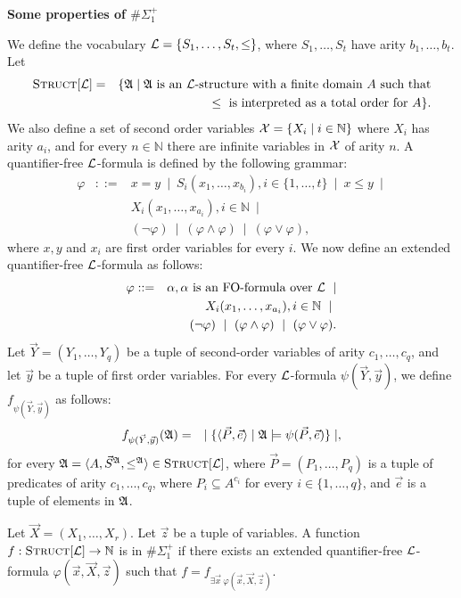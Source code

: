 \documentclass[12pt]{article}
\def\E1{\#\Sigma_1^{+}}
\def\Truc{\textsc{Struct}[\L]}
\def\A{{\frak A}}
\def\L{{\cal L}}
\def\N{\mathbb{N}}
\def\P{\vec{P}}
\def\S{\vec{S}}
\def\X{\vec{X}}
\def\Y{\vec{Y}}
\def\e{\vec{e}} %
\def\x{\vec{x}} %
\def\y{\vec{y}} %
\def\z{\vec{z}} %
\begin{document}
\begin{center}
{ \LARGE \bf
  Some properties of $\E1$
}
\end{center}

We define the vocabulary $\L = \{ S_1,\dots,S_t, \leq \}$, where $S_1,\dots,S_t$ have arity $b_1,\dots,b_t$. Let
\begin{eqnarray*}
\Truc &=& \{\A \mid \A \text{ is an } \L \text{-structure with a finite domain } A \text{ such that} \\
&& \leq \text{ is interpreted as a total order for } A \}.
\end{eqnarray*}
We also define a set of second order variables ${\cal X} = \{ X_i \mid i\in\N \}$ where $X_i$ has arity $a_i$, and for every $n \in \N$ there are infinite variables in ${\cal X}$ of arity $n$. A quantifier-free $\L$-formula is defined by the following grammar:
\begin{eqnarray*}
\varphi &::=& x = y \ \mid \ S_i(x_1,\dots,x_{b_i}), i \in \{1,\dots,t\} \ \mid \ x \leq y \ \mid \\
&& X_i(x_1,\dots,x_{a_i}), i\in\N \ \mid \\ 
&& (\neg \varphi) \ \mid \ (\varphi \wedge \varphi) \ \mid \ (\varphi \vee \varphi),
\end{eqnarray*}
where $x,y$ and $x_i$ are first order variables for every $i$. We now define an extended quantifier-free $\L$-formula as follows:
\begin{eqnarray*}
\varphi &::=& \alpha, \alpha \text{ is an FO-formula over } \L  \ \mid \\
&& X_i(x_1,\dots,x_{a_i}), i\in\N \ \mid \ \\
&& (\neg \varphi) \ \mid \ (\varphi \wedge \varphi) \ \mid \ (\varphi \vee \varphi).
\end{eqnarray*}
Let $\Y = (Y_1,\dots,Y_q)$ be a tuple of second-order variables of arity $c_1,\ldots,c_q$, and let $\y$ be a tuple of first order variables. For every $\L$-formula $\psi(\Y,\y)$, we define $f_{\psi(\Y,\y)}$ as follows:
\begin{eqnarray*}
f_{\psi(\Y,\y)}(\A) &=& \mid \{ \langle \P, \e \rangle \mid \A \models \psi(\P,\e) \} \mid,
\end{eqnarray*}
for every $\A = \langle A, \S^{\A}, \leq^{\A} \rangle \in \Truc$, where $\P = (P_1,\ldots,P_q)$ is a tuple of predicates of arity $c_1,\ldots,c_q$, where $P_i \subseteq A^{c_i}$ for every $i \in \{1,\ldots,q\}$, and $\e$ is a tuple of elements in $\A$.

Let $\X = (X_1,\dots,X_r)$. Let $\z$ be a tuple of variables. A function $f:\Truc \to \mathbb{N}$ is in $\E1$ if there exists an extended quantifier-free $\L$-formula $\varphi(\x,\X,\z)$ such that $f = f_{\exists \x \: \varphi(\x,\X,\z)}.$\\
\end{document}

